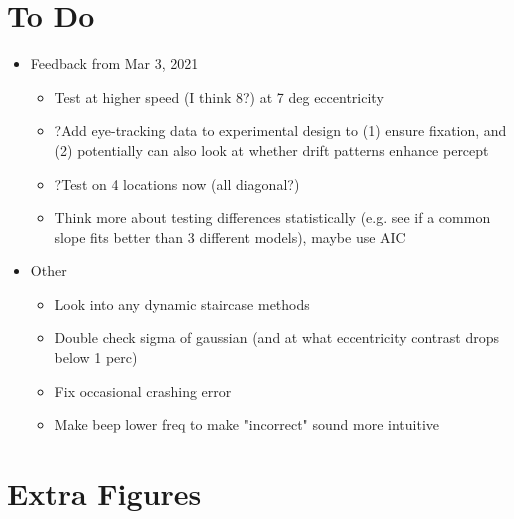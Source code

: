 \documentclass[11pt]{article} %
\begin{document}
\section{To Do} 
\begin{itemize}
\item Feedback from Mar 3, 2021
	\begin{itemize}
	\item Test at higher speed (I think 8?) at 7 deg eccentricity
	\item ?Add eye-tracking data to experimental design to (1) ensure fixation, and (2) potentially can also look at whether drift patterns enhance percept
	\item ?Test on 4 locations now (all diagonal?)
	\item Think more about testing differences statistically (e.g. see if a common slope fits better than 3 different models), maybe use AIC
	\end{itemize}
\item Other
	\begin{itemize}
	\item Look into any dynamic staircase methods
	\item Double check sigma of gaussian (and at what eccentricity contrast drops below 1 perc)
	\item Fix occasional crashing error
	\item Make beep lower freq to make "incorrect" sound more intuitive
	\end{itemize}
\end{itemize}

\section{Extra Figures}
\end{document}

